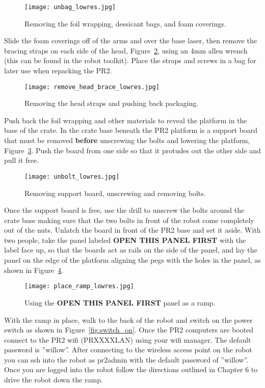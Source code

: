 \begin{figure}[h]
\centering
\texttt{[image: unbag\_lowres.jpg]}
\caption{Removing the foil wrapping, dessicant bags, and foam coverings.}
\label{fig:unbagPR2}
\end{figure}

Slide the foam coverings off of the arms and over the base laser, then remove
the bracing straps on each side of the head, Figure~\ref{fig:head_straps}, using
an 4mm allen wrench (this can be found in the robot toolkit). Place the straps and screws in a bag for later use when
repacking the PR2.

\begin{figure}[h]
\centering
\texttt{[image: remove\_head\_brace\_lowres.jpg]}
\caption{Removing the head straps and pushing back packaging.}
\label{fig:head_straps}
\end{figure}

Push back the foil wrapping and other materials to reveal the platform in the
base of the crate. In the crate base beneath the PR2 platform is a support board
that must be removed {\bf before} unscrewing the bolts and lowering the platform, 
Figure~\ref{fig:unbolt}. Push the board from one side so that it protudes out the 
other side and pull it free. 

\begin{figure}[h]
\centering
\texttt{[image: unbolt\_lowres.jpg]}
\caption{Removing support board, unscrewing and removing bolts.}
\label{fig:unbolt}
\end{figure}

Once the support board is free, use the drill to unscrew the bolts around
the crate base making sure that the two bolts in front of the robot come
completely out of the nuts. Unlatch the board in front of the PR2 base and set
it aside. With two people, take the panel labeled {\bf OPEN THIS PANEL FIRST} with
the label face up, so that the boards act as rails on the side of the panel, and lay the panel on the edge of the platform aligning the pegs
with the holes in the panel, as shown in Figure~\ref{fig:place_ramp}.

\begin{figure}[h]
\centering
\texttt{[image: place\_ramp\_lowres.jpg]}
\caption{Using the {\bf OPEN THIS PANEL FIRST} panel as a ramp.}
\label{fig:place_ramp}
\end{figure}

With the ramp in place, walk to the back of the robot and switch on the power switch
as shown in Figure~\ref{fig:switch_on}. Once the PR2 computers are booted connect 
to the PR2 wifi (PRXXXXLAN) using your wifi manager. The default password is ''willow''. 
After connecting to the wireless access point on the robot you can ssh into the robot 
as pr2admin with the default password of ''willow''. Once you are logged into the robot 
follow the directions outlined in Chapter 6 to drive the robot down the ramp. 

